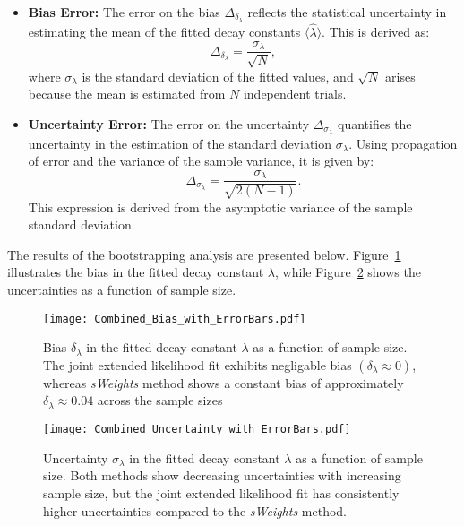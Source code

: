 \documentclass[11pt, a4paper]{article}
\begin{document}
\begin{enumerate}
\begin{itemize}
        \item \textbf{Bias Error:} The error on the bias \(\Delta_{\delta_{\lambda}}\) reflects the statistical uncertainty in estimating the mean of the fitted decay constants \(\langle \hat{\lambda} \rangle\). This is derived as:
        \begin{equation}
        \Delta_{\delta_{\lambda}} = \frac{\sigma_{\lambda}}{\sqrt{N}},
        \label{eq:bias_error}
        \end{equation}
        where \(\sigma_{\lambda}\) is the standard deviation of the fitted values, and \(\sqrt{N}\) arises because the mean is estimated from \(N\) independent trials.

        \item \textbf{Uncertainty Error:} The error on the uncertainty \(\Delta_{\sigma_{\lambda}}\) quantifies the uncertainty in the estimation of the standard deviation \(\sigma_{\lambda}\). Using propagation of error and the variance of the sample variance, it is given by:
        \begin{equation}
        \Delta_{\sigma_{\lambda}} = \frac{\sigma_{\lambda}}{\sqrt{2(N-1)}}.
        \label{eq:uncertainty_error}
        \end{equation}
        This expression is derived from the asymptotic variance of the sample standard deviation. 
    \end{itemize}
\end{enumerate}


The results of the bootstrapping analysis are presented below. Figure~\ref{fig:bias_vs_sample_size} illustrates the bias in the fitted decay constant \(\lambda\), while Figure~\ref{fig:uncertainty_vs_sample_size} shows the uncertainties as a function of sample size.

\begin{figure}[H]
    \centering
    \texttt{[image: Combined\_Bias\_with\_ErrorBars.pdf]}
    \caption{Bias \(\delta_{\lambda}\) in the fitted decay constant \(\lambda\) as a function of sample size. The joint extended likelihood fit exhibits negligable bias \((\delta_{\lambda} \approx 0)\), whereas \textit{sWeights} method shows a constant bias of approximately \( \delta_{\lambda} \approx 0.04 \) across the sample sizes}
    \label{fig:bias_vs_sample_size}
\end{figure}

\begin{figure}[H]
    \centering
    \texttt{[image: Combined\_Uncertainty\_with\_ErrorBars.pdf]}
    \caption{Uncertainty \(\sigma_{\lambda}\) in the fitted decay constant \(\lambda\) as a function of sample size. Both methods show decreasing uncertainties with increasing sample size, but the joint extended likelihood fit has consistently higher uncertainties compared to the \textit{sWeights} method.}
    \label{fig:uncertainty_vs_sample_size}
\end{figure}
\end{document}
